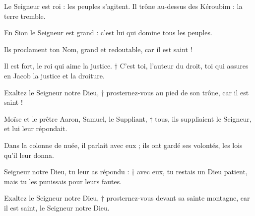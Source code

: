\item Le Seigneur est roi : les peuples s'agitent. Il trône au-dessus des Kéroubim : la terre tremble.
\item En Sion le Seigneur est grand : c'est lui qui domine tous les peuples.
\item Ils proclament ton Nom, grand et redoutable, car il est saint !
\item Il est fort, le roi qui aime la justice. † C'est toi, l'auteur du droit, toi qui assures en Jacob la justice et la droiture.
\item Exaltez le Seigneur notre Dieu, † prosternez-vous au pied de son trône, car il est saint !
\item Moïse et le prêtre Aaron, Samuel, le Suppliant, † tous, ils suppliaient le Seigneur, et lui leur répondait.
\item Dans la colonne de nuée, il parlait avec eux ; ils ont gardé ses volontés, les lois qu'il leur donna.
\item Seigneur notre Dieu, tu leur as répondu : † avec eux, tu restais un Dieu patient, mais tu les punissais pour leurs fautes.
\item Exaltez le Seigneur notre Dieu, † prosternez-vous devant sa sainte montagne, car il est saint, le Seigneur notre Dieu.
